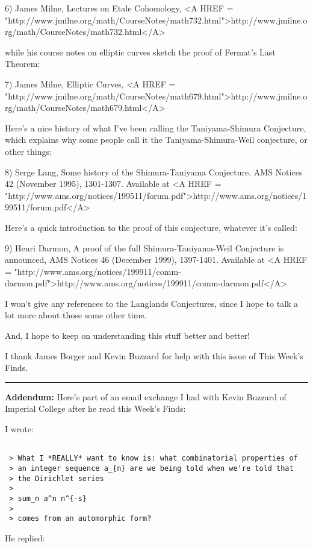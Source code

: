 6) James Milne, Lectures on Etale Cohomology,
<A HREF = "http://www.jmilne.org/math/CourseNotes/math732.html">http://www.jmilne.org/math/CourseNotes/math732.html</A>

while his course notes on elliptic curves sketch the proof of Fermat's Last 
Theorem:

7) James Milne, Elliptic Curves, 
<A HREF = "http://www.jmilne.org/math/CourseNotes/math679.html">http://www.jmilne.org/math/CourseNotes/math679.html</A>

Here's a nice history of what I've been calling the Taniyama-Shimura
Conjecture, which explains why some people call it the Taniyama-Shimura-Weil 
conjecture, or other things:

8) Serge Lang, Some history of the Shimura-Taniyama Conjecture,
AMS Notices 42 (November 1995), 1301-1307.  Available at
<A HREF = "http://www.ams.org/notices/199511/forum.pdf">http://www.ams.org/notices/199511/forum.pdf</A>

Here's a quick introduction to the proof of this conjecture, whatever 
it's called:

9) Henri Darmon, A proof of the full Shimura-Taniyama-Weil Conjecture
is announced, AMS Notices 46 (December 1999), 1397-1401.  Available
at <A HREF = "http://www.ams.org/notices/199911/comm-darmon.pdf">http://www.ams.org/notices/199911/comm-darmon.pdf</A>

I won't give any references to the Langlands Conjectures, since
I hope to talk a lot more about those some other time.

And, I hope to keep on understanding this stuff better and better!  

I thank James Borger and Kevin Buzzard for help with this issue of
This Week's Finds.

\par\noindent\rule{\textwidth}{0.4pt}
\textbf{Addendum:} Here's part of an email exchange I had with Kevin Buzzard
of Imperial College after he read this Week's Finds:

I wrote:


\begin{verbatim}

 > What I *REALLY* want to know is: what combinatorial properties of
 > an integer sequence a_{n} are we being told when we're told that
 > the Dirichlet series
 >
 > sum_n a^n n^{-s}
 >
 > comes from an automorphic form?
\end{verbatim}
    
He replied:

